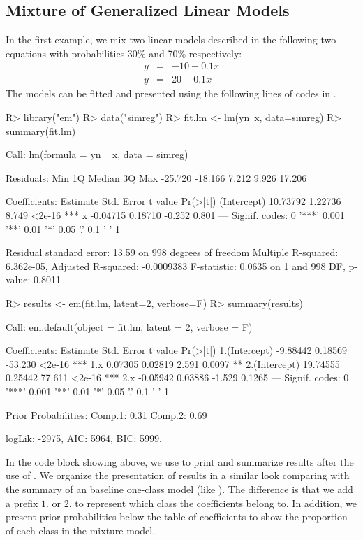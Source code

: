 \documentclass[nojss]{jss}
\begin{document}
   \subsection{Mixture of Generalized Linear Models}
   In the first example, we mix two linear models described in the following two equations with probabilities 30\% and 70\% respectively:
   \begin{eqnarray}
   y &=& {-10} + 0.1 x \\
   y &=& 20 - 0.1 x
   \end{eqnarray}
  The models can be fitted and presented using the following lines of codes in .
\begin{Schunk}
\begin{Sinput}
R> library("em")
R> data("simreg")
R> fit.lm <- lm(yn~x, data=simreg)
R> summary(fit.lm)
\end{Sinput}
\begin{Soutput}
Call:
lm(formula = yn ~ x, data = simreg)

Residuals:
    Min      1Q  Median      3Q     Max 
-25.720 -18.166   7.212   9.926  17.206 

Coefficients:
            Estimate Std. Error t value Pr(>|t|)    
(Intercept) 10.73792    1.22736   8.749   <2e-16 ***
x           -0.04715    0.18710  -0.252    0.801    
---
Signif. codes:  0 '***' 0.001 '**' 0.01 '*' 0.05 '.' 0.1 ' ' 1

Residual standard error: 13.59 on 998 degrees of freedom
Multiple R-squared:  6.362e-05,	Adjusted R-squared:  -0.0009383 
F-statistic: 0.0635 on 1 and 998 DF,  p-value: 0.8011
\end{Soutput}
\begin{Sinput}
R> results <- em(fit.lm, latent=2, verbose=F)
R> summary(results)
\end{Sinput}
\begin{Soutput}
Call:
em.default(object = fit.lm, latent = 2, verbose = F)

Coefficients: 
              Estimate Std. Error t value Pr(>|t|)    
1.(Intercept) -9.88442    0.18569 -53.230   <2e-16 ***
1.x            0.07305    0.02819   2.591   0.0097 ** 
2.(Intercept) 19.74555    0.25442  77.611   <2e-16 ***
2.x           -0.05942    0.03886  -1.529   0.1265    
---
Signif. codes:  0 '***' 0.001 '**' 0.01 '*' 0.05 '.' 0.1 ' ' 1

Prior Probabilities: 
Comp.1: 0.31
Comp.2: 0.69


logLik: -2975, AIC: 5964, BIC: 5999. 
\end{Soutput}
\end{Schunk}
  In the code block showing above, we use  to print and summarize results after the use of . We organize the presentation of results in a similar look comparing with the summary of an baseline one-class model (like ). The difference is that we add a prefix $1.$ or $2.$ to represent which class the coefficients belong to. In addition, we present prior probabilities below the table of coefficients to show the proportion of each class in the mixture model.
  
\end{document}

